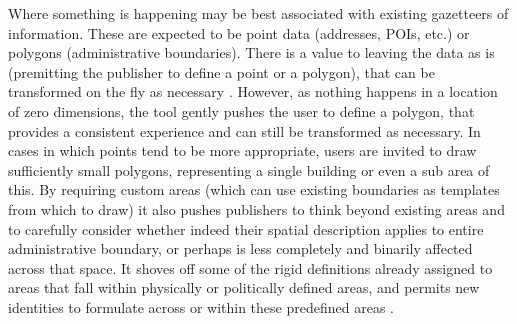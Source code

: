 Where something is happening may be best associated with existing gazetteers of information. These are expected to be point data (addresses, POIs, etc.) or polygons (administrative boundaries). There is a value to leaving the data as is (premitting the publisher to define a point or a polygon), that can be transformed on the fly as necessary \cite{Brown2012}. However, as nothing happens in a location of zero dimensions, the tool gently pushes the user to define a polygon, that provides a consistent experience and can still be transformed as necessary. %
In cases in which points tend to be more appropriate, users are invited to draw sufficiently small polygons, representing a single building or even a sub area of this. %
By requiring custom areas (which can use existing boundaries as templates from which to draw) it also pushes publishers to think beyond existing areas and to carefully consider whether indeed their spatial description applies to entire administrative boundary, or perhaps is less completely and binarily affected across that space. It shoves off some of the rigid definitions already assigned to areas that fall within physically or politically defined areas, and permits new identities to formulate across or within these predefined areas \cite{McQueenBaker2019}. %

